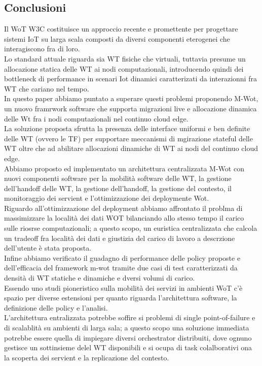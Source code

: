 \documentclass[11pt]{article}
\begin{document}
	\subsection{Conclusioni}
	Il WoT W3C costituisce un approccio recente e promettente per progettare sistemi IoT su larga scala composti da diversi componenti eterogenei che interagiscono fra di loro. \\
	Lo standard attuale riguarda sia WT fisiche che virtuali, tuttavia presume un allocazione statica delle  WT ai nodi computazionali, introducendo quindi dei bottleneck di performance in scenari Iot dinamici caratterizati da interazionni fra WT che cariano nel tempo. \\
	In questo paper abbiamo puntato a superare questi problemi proponendo M-Wot, un nuovo framrwork software che supporta migrazioni live e allocazione dinamica delle Wt fra i nodi computazionali nel continuo cloud edge. \\
	La soluzione proposta sfrutta la presenza delle interface uniformi e ben definite delle WT (ovvero le TF) per supportare meccanismi di mgirazione stateful delle WT oltre che ad abilitare allocazioni dinamiche di WT ai nodi del continuo cloud edge. \\
	Abbiamo proposto ed implementato un architettura centralizzata M-Wot con nuovi componenti software per la mobilità software delle WT, la gestione dell'handoff delle WT, la gestione dell'handoff, la gestione del contesto, il monitoraggio dei servient e l'ottimizzazione dei deploymente Wot. \\
	Riguardo all'ottimizzazione del deployment abbiamo affrontato il problma di massimizzare la località dei dati WOT bilanciando allo stesso tempo il carico sulle riosrse computazionali; a questo scopo, un euristica centralizzata che calcola un tradeoff fra località dei dati e giustizia del carico di lavoro a descrzione dell'utente è stata proposta. \\
	Infine abbiamo verificato il guadagno di performance delle policy proposte e dell'efficacia del framework m-wot tramite due casi di test caratterizzati da densità di WT statiche e dinamiche e dversi volumi di carico. \\
	Essendo uno studi pioneristico sulla mobilità dei servizi in ambienti WoT c'è spazio per diverse estensioni per quanto riguarda l'architettura software, la definizione delle policy e l'analisi. \\
	L'architettura entralizzata potrebbe soffire si problemi di single point-of-failure e di scalablità su ambienti di larga sala; a questo scopo una soluzione immediata potrebbe essere quella di impiegare diversi orchestrator distribuiti, dove ognuno gestisce un sottinsieme delel WT disponibili e si ocupa di task colalborativi ona la scoperta dei servient e la replicazione del contesto. \\
\end{document}
